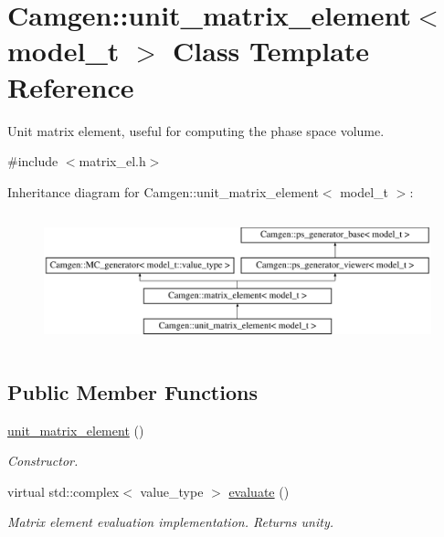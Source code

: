 \hypertarget{a00571}{}\section{Camgen\+:\+:unit\+\_\+matrix\+\_\+element$<$ model\+\_\+t $>$ Class Template Reference}
\label{a00571}


Unit matrix element, useful for computing the phase space volume.  




{\ttfamily \#include $<$matrix\+\_\+el.\+h$>$}

Inheritance diagram for Camgen\+:\+:unit\+\_\+matrix\+\_\+element$<$ model\+\_\+t $>$\+:\begin{figure}[H]
\begin{center}
\leavevmode
\includegraphics[height=3.875432cm]{a00571}
\end{center}
\end{figure}
\subsection*{Public Member Functions}
\begin{DoxyCompactItemize}
\item 
\hypertarget{a00571_a425d1091a6cdd135d8a329305cd843df}{}\hyperlink{a00571_a425d1091a6cdd135d8a329305cd843df}{unit\+\_\+matrix\+\_\+element} ()\label{a00571_a425d1091a6cdd135d8a329305cd843df}

\begin{DoxyCompactList}\small\item\em Constructor. \end{DoxyCompactList}\item 
\hypertarget{a00571_a63386092eb9ec18ef6e7e1a5859b0a7a}{}virtual std\+::complex$<$ value\+\_\+type $>$ \hyperlink{a00571_a63386092eb9ec18ef6e7e1a5859b0a7a}{evaluate} ()\label{a00571_a63386092eb9ec18ef6e7e1a5859b0a7a}

\begin{DoxyCompactList}\small\item\em Matrix element evaluation implementation. Returns unity. \end{DoxyCompactList}\end{DoxyCompactItemize}
